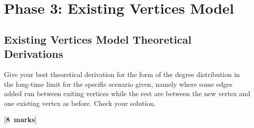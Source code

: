 \documentclass[a4paper,12pt]{article}
\newcounter{nmarks}
\newcommand{\qmarks}[1]{\addtocounter{nmarks}{#1} }
\renewcommand{\qmarks}[1]{\addtocounter{nmarks}{#1} \hspace*{\fill} [\textbf{#1~marks}]}
\begin{document}



\section{Phase 3: Existing Vertices Model}



\subsection{Existing Vertices Model Theoretical Derivations}

Give your best theoretical derivation for the form of the degree distribution in the long-time limit for the specific scenario given, namely where some edges added run between exiting vertices while the rest are between the new vertex and one existing vertex as before. Check your solution. \qmarks{8}
\end{document}
